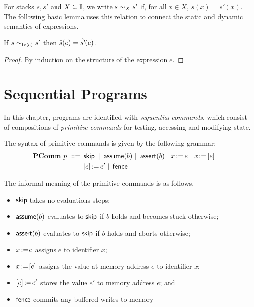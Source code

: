 \documentclass[11pt]{report}         %
\begin{document}
For stacks $s,s'$ and $X \subseteq \mathbb{I}$, we write $s \sim_{X} s'$ if, for all $x \in X$, $s(x) = s'(x)$. The following basic lemma uses this relation to connect the static and dynamic semantics of expressions. 
\begin{proposition}
\label{lem:exp-stcong}
    If $s \sim_{\mathrm{fv}(e)} s'$ then $\hat{s}(e) = \hat{s'}(e)$. 
\end{proposition}

\begin{proof}
By induction on the structure of the expression $e$. 
\end{proof}

\section{Sequential Programs}
\label{sec:sequential-programs}

In this chapter, programs are identified with \emph{sequential commands}, which consist of compositions of \emph{primitive commands} for testing, accessing and modifying state. 

The syntax of primitive commands is given by the following grammar: \begin{align*} \mathbf{PComm}~p ~::=~ & \operatorname{\mathsf{skip}} ~|~ \operatorname{\mathsf{assume}}(b) ~|~ \operatorname{\mathsf{assert}}(b) ~|~ x \operatorname{:\!=} e ~|~ x \operatorname{:\!=} \left[ e \right] ~|~ \\ 
    & \left[ e \right] \operatorname{:\!=} e' ~|~ \operatorname{\mathsf{fence}}
\end{align*}

The informal meaning of the primitive commands is as follows. \begin{itemize}
    \item $\operatorname{\mathsf{skip}}$ takes no evaluations steps;
    \item $\operatorname{\mathsf{assume}}(b)$ evaluates to $\operatorname{\mathsf{skip}}$ if $b$ holds and becomes stuck otherwise; 
    \item $\operatorname{\mathsf{assert}}(b)$ evaluates to $\operatorname{\mathsf{skip}}$ if $b$ holds and aborts otherwise;
    \item $x \operatorname{:\!=} e$ assigns $e$ to identifier $x$; 
    \item $x \operatorname{:\!=} \left[ e \right]$ assigns the value at memory address $e$ to identifier $x$; 
    \item $\left[ e \right] \operatorname{:\!=} e'$ stores the value $e'$ to memory address $e$; and
    \item $\operatorname{\mathsf{fence}}$ commits any buffered writes to memory 
\end{itemize}
\end{document}
